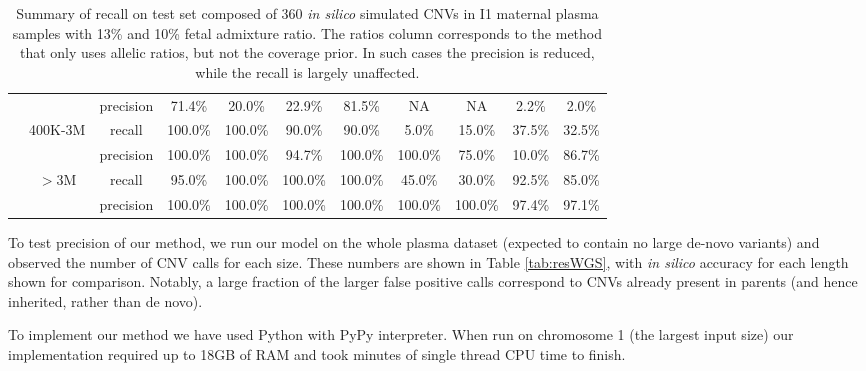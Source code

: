 \begin{table*}[t]
\begin{tabular}{c|c|c||c|c||c|c||c|c||c|c}
    &        &    precision    &    71.4\%    &    20.0\%    &    22.9\%    &    81.5\%    &    NA    &    NA    &    2.2\%    &    2.0\%    \\    
    &    400K-3M    &    recall    &    100.0\%    &    100.0\%    &    90.0\%    &    90.0\%    &    5.0\%    &    15.0\%    &    37.5\%    &    32.5\%    \\    
    &        &    precision    &    100.0\%    &    100.0\%    &    94.7\%    &    100.0\%    &    100.0\%    &    75.0\%    &    10.0\%    &    86.7\%    \\    
    &    $>$3M    &    recall    &    95.0\%    &    100.0\%    &    100.0\%    &    100.0\%    &    45.0\%    &    30.0\%    &    92.5\%    &    85.0\%    \\    
    &        &    precision    &    100.0\%    &    100.0\%    &    100.0\%    &    100.0\%    &    100.0\%    &    100.0\%    &    97.4\%    &    97.1\%    \\   	
\end{tabular}
\vspace{3pt}
\caption{Summary of recall on test set composed of 360 \emph{in silico} simulated CNVs in I1 maternal plasma samples with 13\% and 10\% fetal admixture ratio. The ratios column corresponds to the method that only uses allelic ratios, but not the coverage prior. In such cases the precision is reduced, while the recall is largely unaffected.  }
\label{tab:resRecall} 
\end{table*}

To test precision of our method, we run our model on the whole plasma dataset (expected to contain no large de-novo variants) and observed the number of CNV calls for each size. These numbers are shown in Table \ref{tab:resWGS}, with \textit{in silico} accuracy for each length shown for comparison. Notably, a large fraction of the larger false positive calls correspond to CNVs already present in parents (and hence inherited, rather than de novo). 

To implement our method we have used Python with PyPy interpreter. When run on chromosome 1 (the largest input size) our implementation required up to 18GB of RAM and took  minutes of single thread CPU time to finish.


